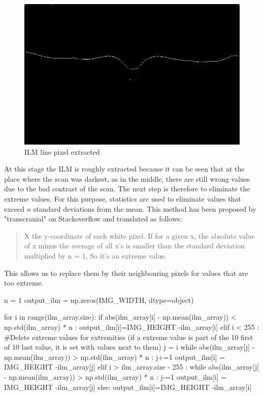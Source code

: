 \documentclass[12pt,a4paper]{scrartcl}
\begin{document}
\begin{figure}[H]
    \centering
    \includegraphics[width=1\textwidth]{./images/ILM_pixel_line_Extracted.jpeg}
    \caption{ILM line pixel extracted}
    \label{fig:ILM_pixel_line}
\end{figure}
At this stage the ILM is roughly extracted because it can be seen that at the place where the scan was darkest, as in the middle, there are still wrong values due to the bad contrast of the scan. The next step is therefore to eliminate the extreme values.
For this purpose, statistics are used to eliminate values that exceed $n$ standard deviations from the mean. This method has been proposed by "transcranial" on Stackoverflow \cite{stackoverflow:transcranial} and translated as follows: 

\begin{quote}
X the y-coordinate of each white pixel.
If for a given x, the absolute value of x minus the average of all x's is smaller than the standard deviation multiplied by n = 1,
So it's an extreme value.
\end{quote}


This allows us to replace them by their neighbouring pixels for values that are too extreme. 

\begin{python}
n = 1
output_ilm = np.zeros(IMG_WIDTH, dtype=object)

for i in range(ilm_array.size):
  if abs(ilm_array[i] - np.mean(ilm_array)) < np.std(ilm_array) * n :
    output_ilm[i]=IMG_HEIGHT -ilm_array[i]
  elif i < 255 :
   #Delete extreme values for extremities (if a extreme value is part of the 10 first of 10 last value, it is set with values next to them)
   j = i
   while abs(ilm_array[j] - np.mean(ilm_array)) > np.std(ilm_array) * n :
     j+=1
   output_ilm[i] = IMG_HEIGHT -ilm_array[j]
  elif i > ilm_array.size - 255 :
    while abs(ilm_array[j] - np.mean(ilm_array)) > np.std(ilm_array) * n :
     j-=1
    output_ilm[i] = IMG_HEIGHT -ilm_array[j]
  else:
    output_ilm[i]=IMG_HEIGHT -ilm_array[i]

\end{python}
\end{document}
